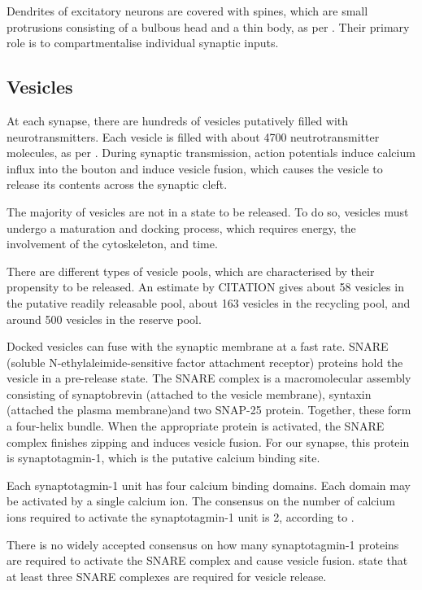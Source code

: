 \documentclass[a4paper]{article}
\begin{document}
Dendrites of excitatory neurons are covered with spines, which are small protrusions consisting of a bulbous head and a thin body, as per \cite{Arellano:FrontNeurosci:2007}. Their primary role is to compartmentalise individual synaptic inputs.

\subsection{Vesicles}
At each synapse, there are hundreds of vesicles putatively filled with neurotransmitters. Each vesicle is filled with about 4700 neutrotransmitter molecules, as per \cite{Bruns:Nature:1995}. During synaptic transmission, action potentials induce calcium influx into the bouton and induce vesicle fusion, which causes the vesicle to release its contents across the synaptic cleft.

The majority of vesicles are not in a state to be released. To do so, vesicles must undergo a maturation and docking process, which requires energy, the involvement of the cytoskeleton, and time. 

There are different types of vesicle pools, which are characterised by their propensity  to be released. An estimate by CITATION gives about 58 vesicles in the putative readily releasable pool, about 163 vesicles in the recycling pool, and around 500 vesicles in the reserve pool.

Docked vesicles can fuse with the synaptic membrane at a fast rate. SNARE (soluble N-ethylaleimide-sensitive factor attachment receptor) proteins hold the vesicle in a pre-release state. The SNARE complex is a macromolecular assembly consisting of synaptobrevin (attached to the vesicle membrane), syntaxin (attached the plasma membrane)and two SNAP-25 protein. Together, these form a four-helix bundle. When the appropriate protein is activated, the SNARE complex finishes zipping and induces vesicle fusion. For our synapse, this protein is synaptotagmin-1, which is the putative calcium binding site. 

Each synaptotagmin-1 unit has four calcium binding domains. Each domain may be activated by a single calcium ion. The consensus on the number of calcium ions required to activate the synaptotagmin-1 unit is 2, according to \cite{Dittrich:BiophysJ:2013}.

There is no widely accepted consensus on how many synaptotagmin-1 proteins are required to activate the SNARE complex and cause vesicle fusion. \cite{Dittrich:BiophysJ:2013} state that at least three SNARE complexes are required for vesicle release.
\end{document}
